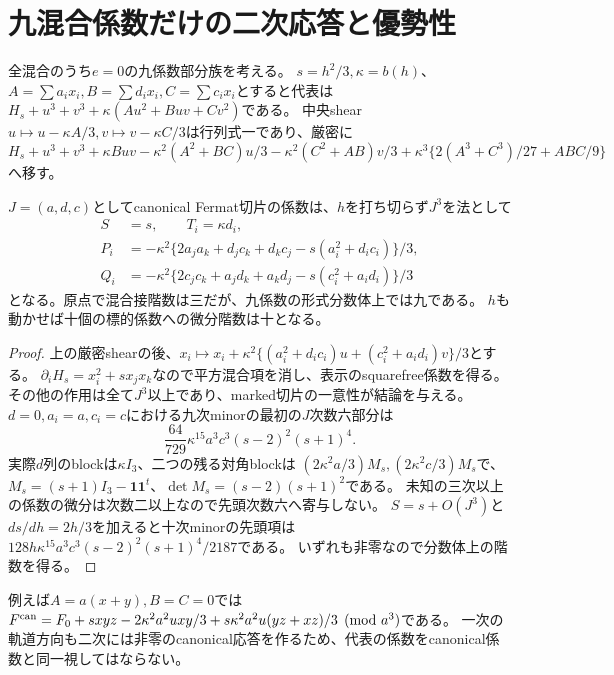 \section{九混合係数だけの二次応答と優勢性}
全混合のうち$e=0$の九係数部分族を考える。
$s=h^2/3,\kappa=b(h)$、$A=\sum a_ix_i,B=\sum d_ix_i,C=\sum c_ix_i$とすると代表は
$H_s+u^3+v^3+\kappa(Au^2+Buv+Cv^2)$である。
中央shear $u\mapsto u-\kappa A/3,v\mapsto v-\kappa C/3$は行列式一であり、厳密に
\[
 H_s+u^3+v^3+\kappa Buv-\kappa^2(A^2+BC)u/3-\kappa^2(C^2+AB)v/3
 +\kappa^3\{2(A^3+C^3)/27+ABC/9\}
\]
へ移す。
\begin{proposition}
$J=(a,d,c)$としてcanonical Fermat切片の係数は、$h$を打ち切らず$J^3$を法として
\begin{align*}
 S&=s,\qquad T_i=\kappa d_i,\\
 P_i&=-\kappa^2\{2a_ja_k+d_jc_k+d_kc_j-s(a_i^2+d_ic_i)\}/3,\\
 Q_i&=-\kappa^2\{2c_jc_k+a_jd_k+a_kd_j-s(c_i^2+a_id_i)\}/3
\end{align*}
となる。原点で混合接階数は三だが、九係数の形式分数体上では九である。
$h$も動かせば十個の標的係数への微分階数は十となる。
\end{proposition}
\begin{proof}
上の厳密shearの後、$x_i\mapsto x_i+\kappa^2\{(a_i^2+d_ic_i)u+(c_i^2+a_id_i)v\}/3$とする。
$\partial_iH_s=x_i^2+sx_jx_k$なので平方混合項を消し、表示のsquarefree係数を得る。
その他の作用は全て$J^3$以上であり、marked切片の一意性が結論を与える。
$d=0,a_i=a,c_i=c$における九次minorの最初の$J$次数六部分は
\[
 \frac{64}{729}\kappa^{15}a^3c^3(s-2)^2(s+1)^4.
\]
実際$d$列のblockは$\kappa I_3$、二つの残る対角blockは
$(2\kappa^2a/3)M_s,(2\kappa^2c/3)M_s$で、
$M_s=(s+1)I_3-\mathbf1\mathbf1^t$、$\det M_s=(s-2)(s+1)^2$である。
未知の三次以上の係数の微分は次数二以上なので先頭次数六へ寄与しない。
$S=s+O(J^3)$と$ds/dh=2h/3$を加えると十次minorの先頭項は
$128h\kappa^{15}a^3c^3(s-2)^2(s+1)^4/2187$である。
いずれも非零なので分数体上の階数を得る。
\end{proof}
例えば$A=a(x+y),B=C=0$では
$F^{\rm can}=F_0+sxyz-2\kappa^2a^2uxy/3+s\kappa^2a^2u(yz+xz)/3\pmod{a^3}$である。
一次の軌道方向も二次には非零のcanonical応答を作るため、代表の係数をcanonical係数と同一視してはならない。

